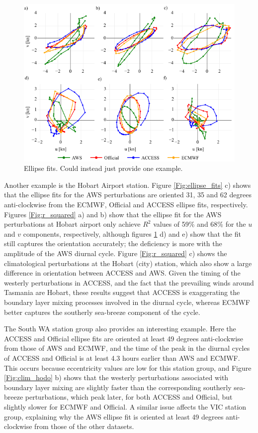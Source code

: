 \documentclass{ametsoc}
\begin{document}
\begin{figure}
\centering
\includegraphics[width=39pc]{ellipse_hodo.pdf}
\caption{Ellipse fits. Could instead just provide one example.}
\label{Fig:ellipse_hodo}
\end{figure}

Another example is the Hobart Airport station. Figure \ref{Fig:ellipse_fits} c) shows that the ellipse fits for the AWS perturbations are oriented 31, 35 and 62 degrees anti-clockwise from the ECMWF, Official and ACCESS ellipse fits, respectively. Figures \ref{Fig:r_squared} a) and b) show that the ellipse fit for the AWS perturbations at Hobart airport only achieve $R^2$ values of 59\% and 68\% for the $u$ and $v$ components, respectively, although figures \ref{Fig:ellipse_hodo} d) and e) show that the fit still captures the orientation accurately; the deficiency is more with the amplitude of the AWS diurnal cycle. Figure \ref{Fig:r_squared} c) shows the climatological perturbations at the Hobart (city) station, which also show a large difference in orientation between ACCESS and AWS. Given the timing of the westerly perturbations in ACCESS, and the fact that the prevailing winds around Tasmania are Hobart, these results suggest that ACCESS is exaggerating the boundary layer mixing processes involved in the diurnal cycle, whereas ECMWF better captures the southerly sea-breeze component of the cycle.   

The South WA station group also provides an interesting example. Here the ACCESS and Official ellipse fits are oriented at least 49 degrees anti-clockwise from those of AWS and ECMWF, and the time of the peak in the diurnal cycles of ACCESS and Official is at least 4.3 hours earlier than AWS and ECMWF. This occurs because eccentricity values are low for this station group, and Figure \ref{Fig:clim_hodo} b) shows that the westerly perturbations associated with boundary layer mixing are slightly faster than the corresponding southerly sea-breeze perturbations, which peak later, for both ACCESS and Official, but slightly slower for ECMWF and Official. A similar issue affects the VIC station group, explaining why the AWS ellipse fit is oriented at least 49 degrees anti-clockwise from those of the other datasets.  
\end{document}
